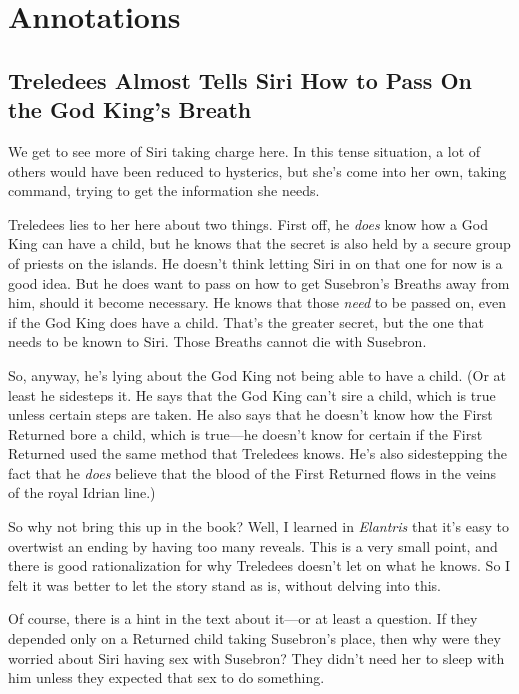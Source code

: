 \section*{Annotations}

\subsection*{Treledees Almost Tells Siri How to Pass On the God King’s Breath}

We get to see more of Siri taking charge here. In this tense situation, a lot of others would have been reduced to hysterics, but she’s come into her own, taking command, trying to get the information she needs.

Treledees lies to her here about two things. First off, he \textit{does} know how a God King can have a child, but he knows that the secret is also held by a secure group of priests on the islands. He doesn’t think letting Siri in on that one for now is a good idea. But he does want to pass on how to get Susebron’s Breaths away from him, should it become necessary. He knows that those \textit{need} to be passed on, even if the God King does have a child. That’s the greater secret, but the one that needs to be known to Siri. Those Breaths cannot die with Susebron.

So, anyway, he’s lying about the God King not being able to have a child. (Or at least he sidesteps it. He says that the God King can’t sire a child, which is true unless certain steps are taken. He also says that he doesn’t know how the First Returned bore a child, which is true—he doesn’t know for certain if the First Returned used the same method that Treledees knows. He’s also sidestepping the fact that he \textit{does} believe that the blood of the First Returned flows in the veins of the royal Idrian line.)

So why not bring this up in the book? Well, I learned in \textit{Elantris} that it’s easy to overtwist an ending by having too many reveals. This is a very small point, and there is good rationalization for why Treledees doesn’t let on what he knows. So I felt it was better to let the story stand as is, without delving into this.

Of course, there is a hint in the text about it—or at least a question. If they depended only on a Returned child taking Susebron’s place, then why were they worried about Siri having sex with Susebron? They didn’t need her to sleep with him unless they expected that sex to do something.

